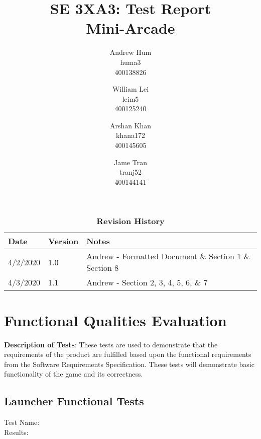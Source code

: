 \documentclass[12pt, titlepage]{article}
\title{SE 3XA3: Test Report\\Mini-Arcade}
\author{Andrew Hum \\ huma3 \\ 400138826 \and
		William Lei \\ leim5 \\ 400125240 \and
		Arshan Khan \\ khana172 \\ 400145605 \and
		Jame Tran \\ tranj52 \\ 400144141
}
\date{}
\begin{document}
\maketitle
\newpage
\tableofcontents
\listoftables
\listoffigures

\begin{table}[!hbp]
\caption{\bf Revision History}
\begin{tabularx}{\textwidth}{p{3cm}p{2cm}X}
\toprule {\bf Date} & {\bf Version} & {\bf Notes} \\
\midrule
4/2/2020 & 1.0 & Andrew - Formatted Document \& Section 1 \& Section 8\\
4/3/2020 & 1.1 & Andrew - Section 2, 3, 4, 5, 6, \& 7 \\ 
\bottomrule
\end{tabularx}
\end{table}

\newpage

\section{Functional Qualities Evaluation}

\textbf{Description of Tests}: These tests are used to demonstrate that the requirements of the product are fulfilled based upon the functional requirements from the Software Requirements Specification. These tests will demonstrate basic functionality of the game and its correctness. \\
	
\subsection{Launcher Functional Tests}
	Test Name: \\
	Results: \\ \\
	
\end{document}
